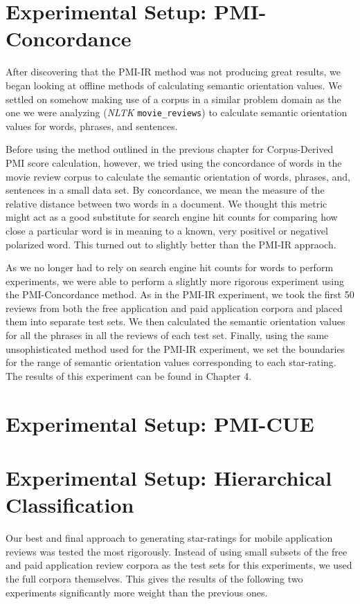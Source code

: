 \documentclass[11pt]{report} %
\begin{document}
\section{Experimental Setup: PMI-Concordance}

After discovering that the PMI-IR method was not producing great results, we began looking at offline methods of calculating semantic orientation values. We settled on somehow making use of a corpus in a similar problem domain as the one we were analyzing (\textit{NLTK} \verb|movie_reviews|) to calculate semantic orientation values for words, phrases, and sentences. 

Before using the method outlined in the previous chapter for Corpus-Derived PMI score calculation, however, we tried using the concordance of words in the movie review corpus to calculate the semantic orientation of words, phrases, and, sentences in a small data set. By concordance, we mean the measure of the relative distance between two words in a document. We thought this metric might act as a good substitute for search engine hit counts for comparing how close a particular word is in meaning to a known, very positivel or negativel polarized word. This turned out to slightly better than the PMI-IR appraoch.

As we no longer had to rely on search engine hit counts for words to perform experiments, we were able to perform a slightly more rigorous experiment using the PMI-Concordance method. As in the PMI-IR experiment, we took the first 50 reviews from both the free application and paid application corpora and placed them into separate test sets. We then calculated the semantic orientation values for all the phrases in all the reviews of each test set. Finally, using the same unsophisticated method used for the PMI-IR experiment, we set the boundaries for the range of semantic orientation values corresponding to each star-rating. The results of this experiment can be found in Chapter 4. 

\section{Experimental Setup: PMI-CUE}

\section{Experimental Setup: Hierarchical Classification}

Our best and final approach to generating star-ratings for mobile application reviews was tested the most rigorously. Instead of using small subsets of the free and paid application review corpora as the test sets for this experiments, we used the full corpora themselves. This gives the results of the following two experiments significantly more weight than the previous ones.
\end{document}
